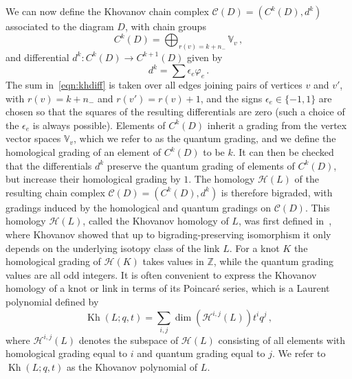 \documentclass[11pt]{article}
\DeclareMathOperator{\Kh}{Kh}
\numberwithin{equation}{section}
\begin{document}
We can now define the Khovanov chain complex $\mathcal{C}(D)=(C^k(D),d^k)$ associated to the diagram $D$, with chain groups 
\begin{equation}
   C^k(D) = \bigoplus_{r(v)= k + n_-}\mathbb{V}_v \,,
\end{equation}
and differential $d^k : C^k(D) \rightarrow C^{k+1}(D)$ given by 
\begin{equation}
\label{eqn:khdiff}
   d^k = \sum \epsilon_e \varphi_e \,.
\end{equation}
The sum in~\eqref{eqn:khdiff} is taken over all edges joining pairs of vertices $v$ and $v'$, with $r(v) = k+n_-$ and $r(v') = r(v) +1$, and  the signs $\epsilon_e \in \{-1,1\}$ are chosen so that the squares of the resulting differentials are zero (such a choice of the $\epsilon_e$ is always possible).
Elements of $C^k(D)$ inherit a grading from the vertex vector spaces $\mathbb{V}_v$, which we refer to as the quantum grading, and we define the homological grading of an element of $C^k(D)$ to be $k$.
It can then be checked that the differentials $d^k$ preserve the quantum grading of elements of $C^k(D)$, but increase their homological grading by $1$.
The homology $\mathcal{H}(L)$ of the resulting chain complex $\mathcal{C}(D)=(C^k(D),d^k)$ is therefore bigraded, with gradings induced by the homological and quantum gradings on $\mathcal{C}(D)$.
This homology $\mathcal{H}(L)$, called the Khovanov homology of $L$, was first defined in~\cite{khovanov2000}, where Khovanov showed that up to bigrading-preserving isomorphism it only depends on the underlying isotopy class of the link $L$.
For a knot $K$ the homological grading of $\mathcal{H}(K)$ takes values in $\mathbb{Z}$, while the quantum grading values are all odd integers.
It is often convenient to express the Khovanov homology of a knot or link in terms of its Poincar\'{e} series, which is a Laurent polynomial defined by
\begin{equation}
\Kh(L;q,t) = \sum_{i,j} \dim (\mathcal{H}^{i,j}(L))t^iq^j \,,
\end{equation}
where $\mathcal{H}^{i,j}(L)$ denotes the subspace of $\mathcal{H}(L)$ consisting of all elements with homological grading equal to $i$ and quantum grading equal to $j$.
We refer to $\Kh(L;q,t)$ as the Khovanov polynomial of $L$.
\end{document}
